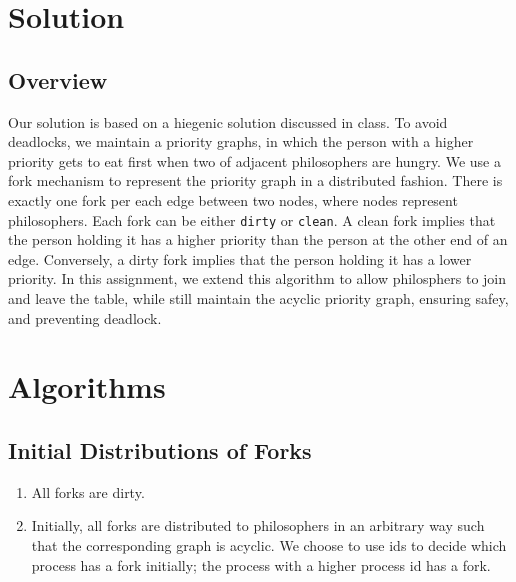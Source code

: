 \documentclass[11pt]{article}
\begin{document}
\section{Solution}
\subsection{Overview}
Our solution is based on a hiegenic solution discussed in class. To avoid deadlocks, we maintain a priority graphs, in which the person with a higher priority gets to eat first when two of adjacent philosophers are hungry. We use a fork mechanism to represent the priority graph in a distributed fashion. There is exactly one fork per each edge between two nodes, where nodes represent philosophers. Each fork can be either \texttt{dirty} or \texttt{clean}. A clean fork implies that the person holding it has a higher priority than the person at the other end of an edge. Conversely, a dirty fork implies that the person holding it has a lower priority. In this assignment, we extend this algorithm to allow philosphers to join and leave the table, while still maintain the acyclic priority graph, ensuring safey, and preventing deadlock.


\section{Algorithms}

\subsection{Initial Distributions of Forks}
\begin{enumerate}
\item All forks are dirty.
\item Initially, all forks are distributed to philosophers in an arbitrary way such that the corresponding graph is acyclic. We choose to use ids to decide which process has a fork initially; the process with a higher process id has a fork.
\end{enumerate}
\end{document}
